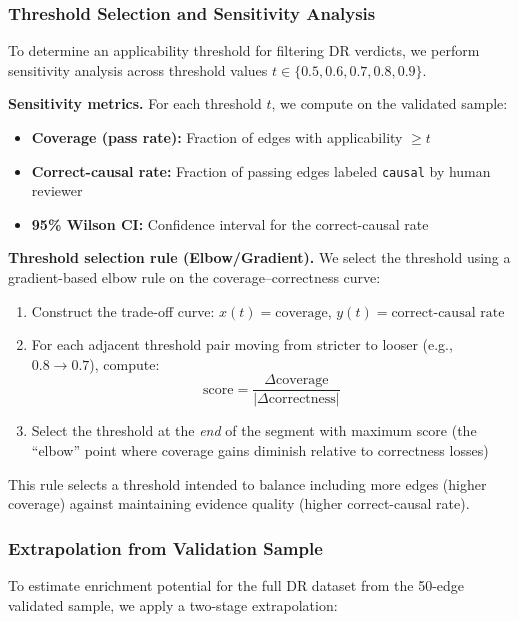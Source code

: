 \subsubsection{Threshold Selection and Sensitivity Analysis}
\label{sec:rq3_threshold_selection}

To determine an applicability threshold for filtering DR verdicts, we perform sensitivity analysis across threshold values $t \in \{0.5, 0.6, 0.7, 0.8, 0.9\}$.

\textbf{Sensitivity metrics.} For each threshold $t$, we compute on the validated sample:
\begin{itemize}[noitemsep]
    \item \textbf{Coverage (pass rate):} Fraction of edges with applicability $\geq t$
    \item \textbf{Correct-causal rate:} Fraction of passing edges labeled \texttt{causal} by human reviewer
    \item \textbf{95\% Wilson CI:} Confidence interval for the correct-causal rate
\end{itemize}

\textbf{Threshold selection rule (Elbow/Gradient).} We select the threshold using a gradient-based elbow rule on the coverage--correctness curve:
\begin{enumerate}[noitemsep]
    \item Construct the trade-off curve: $x(t) = \text{coverage}$, $y(t) = \text{correct-causal rate}$
    \item For each adjacent threshold pair moving from stricter to looser (e.g., $0.8 \rightarrow 0.7$), compute:
    \[
    \text{score} = \frac{\Delta \text{coverage}}{|\Delta \text{correctness}|}
    \]
    \item Select the threshold at the \textit{end} of the segment with maximum score (the ``elbow'' point where coverage gains diminish relative to correctness losses)
\end{enumerate}

This rule selects a threshold intended to balance including more edges (higher coverage) against maintaining evidence quality (higher correct-causal rate).

\subsubsection{Extrapolation from Validation Sample}
\label{sec:rq3_extrapolation}

To estimate enrichment potential for the full DR dataset from the 50-edge validated sample, we apply a two-stage extrapolation:

